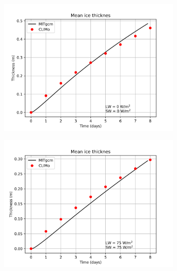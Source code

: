 \documentclass[11pt]{article}
\begin{document}
\begin{figure}[h!]
\begin{subfigure}{0.475\linewidth}
\includegraphics[width=\linewidth]{climo/MITgcm-CLIMo-compare-0-0}
\end{subfigure}
\begin{subfigure}{0.475\linewidth}
\includegraphics[width=\linewidth]{climo/MITgcm-CLIMo-compare-75-75}
\end{subfigure}


\end{figure}
\end{document}
